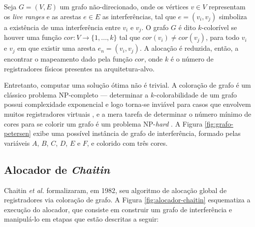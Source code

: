 \documentclass[
	12pt,				%
	openright,			%
	twoside,			%
	a4paper,			%
	tcc,			%
	]{ABNT-DC-UEL}
\begin{document}
Seja $G = (V, E)$ um grafo não-direcionado, onde os vértices $v \in V$ representam os \textit{live ranges} e as arestas $e \in E$ as interferências, tal que $e = (v_i, v_j)$ simboliza a existência de uma interferência entre $v_i$ e $v_j$. O grafo $G$ é dito $k$-colorível se houver uma função $cor: V \to \{1,...,k\}$ tal que $cor(v_i) \ne cor(v_j)$, para todo $v_i$ e $v_j$ em que existir uma aresta
$e_n = (v_i, v_j)$. A alocação é reduzida, então, a encontrar o mapeamento dado pela função $cor$, onde $k$ é o número de registradores físicos presentes na arquitetura-alvo.

Entretanto, computar uma solução ótima não é trivial. A coloração de grafo é um clássico problema NP-completo \cite{karp:72} --- determinar a $k$-colorabilidade de um grafo possui complexidade exponencial e logo torna-se inviável para casos que envolvem muitos registradores virtuais \cite{lawler:76, bjorklund:09}, e a mera tarefa de determinar o número mínimo de cores para se colorir um grafo é um problema NP-\textit{hard} \cite{garey:76}. A Figura \ref{fig:grafo-petersen} exibe uma possível instância de grafo de interferência, formado pelas variáveis $A$, $B$, $C$, $D$, $E$ e $F$, e colorido com três cores.

\subsection{Alocador de \textit{Chaitin}}

Chaitin \textit{et al.} \cite{chaitin:82} formalizaram, em 1982, seu algoritmo de alocação global de registradores via coloração de grafo. A Figura \ref{fig:alocador-chaitin} esquematiza a execução do alocador, que consiste em construir um grafo de interferência e manipulá-lo em etapas que estão descritas a seguir:
\end{document}

